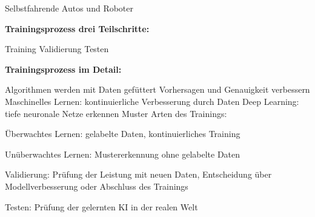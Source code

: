 \documentclass{article}
\begin{document}
\vspace{2mm}Selbstfahrende Autos und Roboter

\vspace{2mm}\textbf{Trainingsprozess drei Teilschritte:}

Training
Validierung
Testen

\vspace{2mm}\textbf{Trainingsprozess im Detail:}

Algorithmen werden mit Daten gefüttert
Vorhersagen und Genauigkeit verbessern
Maschinelles Lernen: kontinuierliche Verbesserung durch Daten
Deep Learning: tiefe neuronale Netze erkennen Muster
Arten des Trainings:

\vspace{2mm}Überwachtes Lernen: gelabelte Daten, kontinuierliches Training

Unüberwachtes Lernen: Mustererkennung ohne gelabelte Daten

Validierung: Prüfung der Leistung mit neuen Daten, Entscheidung über Modellverbesserung oder Abschluss des Trainings

\vspace{2mm}Testen: Prüfung der gelernten KI in der realen Welt




\printbibliography
\end{document}
